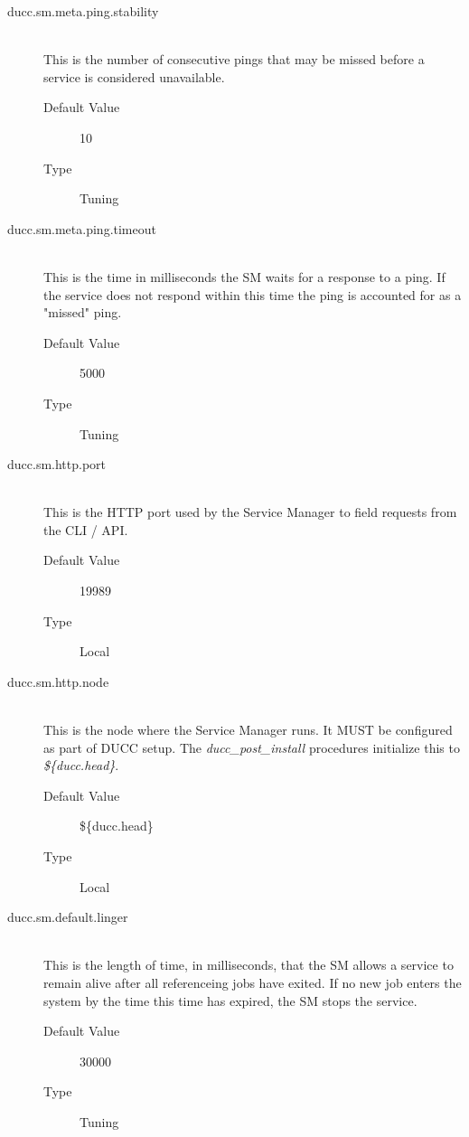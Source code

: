 \begin{description}
      \item[ducc.sm.meta.ping.stability] \hfill \\
        This is the number of consecutive pings that may be missed before a
        service is considered unavailable. 
        \begin{description}
          \item[Default Value] 10 
          \item[Type] Tuning 
        \end{description}

      \item[ducc.sm.meta.ping.timeout] \hfill \\
        This is the time in milliseconds the SM waits for a response to a ping. If the service does 
        not respond within this time the ping is accounted for as a "missed" ping. 
        \begin{description}
          \item[Default Value] 5000 
          \item[Type] Tuning 
        \end{description}
        
      \item[ducc.sm.http.port] \hfill \\
        This is the HTTP port used by the Service Manager to field requests from the CLI / API. 
        \begin{description}          
          \item[Default Value] 19989 
          \item[Type] Local 
        \end{description}
        
      \item[ducc.sm.http.node] \hfill \\
        This is the node where the Service Manager runs. It MUST be configured as part of DUCC 
        setup. The {\em ducc\_post\_install} procedures initialize this to {\em \$\{ducc.head\}}.
        \begin{description}
          \item[Default Value] \$\{ducc.head\}
          \item[Type] Local 
        \end{description}
        
      \item[ducc.sm.default.linger] \hfill \\
        This is the length of time, in milliseconds, that the SM allows a service to remain alive after 
        all referenceing jobs have exited. If no new job enters the system by the time this time has 
        expired, the SM stops the service. 
        \begin{description}
          \item[Default Value] 30000
          \item[Type] Tuning 
        \end{description}
        

\end{description}
